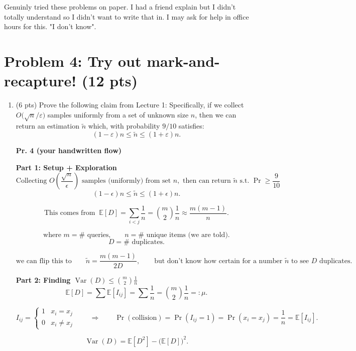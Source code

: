 \documentclass[11pt]{article}
\begin{document}
\begin{enumerate}[label=\arabic*.]
Genuinly tried these problems on paper. I had a friend explain but I didn't totally understand so I didn't want to write that in. I may ask for help in office hours for this. "I don't know".
\end{enumerate}

\section*{Problem 4: Try out mark-and-recapture! (12 pts)}
\begin{enumerate}[label=\arabic*.]
	\item (6 pts) Prove the following claim from Lecture 1: Specifically, if we collect $O\big(\sqrt{n}/\varepsilon\big)$ samples uniformly from a set of unknown size $n$, then we can return an estimation $\tilde n$ which, with probability $9/10$ satisfies:
	\[
	(1-\varepsilon)n \le \tilde n \le (1+\varepsilon)n.
	\]

	\textbf{Pr. 4 (your handwritten flow)}

	\textbf{Part 1: Setup + Exploration}
	\[
	\text{Collecting } O\!\left(\frac{\sqrt{n}}{\epsilon}\right)\text{ samples (uniformly) from set } n,
	\text{ then can return } \tilde n \text{ s.t. } \Pr \ge \frac{9}{10}
	\]
	\[
	(1-\epsilon)n \le \tilde n \le (1+\epsilon)n.
	\]

	\[
	\text{This comes from } \ \mathbb{E}[D]
	= \sum_{i<j}\frac{1}{n}
	= \binom{m}{2}\frac{1}{n}
	\approx \frac{m(m-1)}{n}.
	\]

	\[
	\text{where } m=\#\text{ queries,} \qquad n=\#\text{ unique items (we are told).}
	\]
	\[
	D=\#\text{ duplicates.}
	\]

	\[
	\text{we can flip this to}\qquad
	\tilde n=\frac{m(m-1)}{2D},
	\qquad
	\text{but don't know how certain for a number }\tilde n\text{ to see }D\text{ duplicates.}
	\]

	\textbf{Part 2: Finding $\operatorname{Var}(D) \le \binom{m}{2}\frac{1}{n}$}
	\[
	\mathbb{E}[D]=\sum \mathbb{E}[I_{ij}]
	=\sum \frac{1}{n}
	=\binom{m}{2}\frac{1}{n}
	=:\mu.
	\]

	\[
	I_{ij}=
	\begin{cases}
	1 & x_i=x_j\\
	0 & x_i\ne x_j
	\end{cases}
	\qquad\Rightarrow\qquad
	\Pr(\text{collision})=\Pr(I_{ij}=1)=\Pr(x_i=x_j)=\frac{1}{n}=\mathbb{E}[I_{ij}].
	\]

	\[
	\operatorname{Var}(D)=\mathbb{E}[D^2]-\bigl(\mathbb{E}[D]\bigr)^2.
	\]


\end{enumerate}
\end{document}
